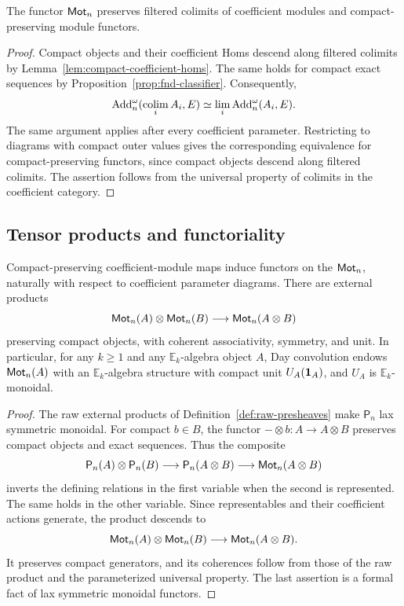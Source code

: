 \begin{lemma}\label{lem:motive-filtered-colimits}
The functor $\mathsf{Mot}_n$ preserves filtered colimits
of coefficient modules and compact-preserving
module functors.
\end{lemma}

\begin{proof}
Compact objects and their coefficient Homs
descend along filtered colimits by
Lemma~\ref{lem:compact-coefficient-homs}.
The same holds for compact exact sequences
by Proposition~\ref{prop:fnd-classifier}.
Consequently,
\[
 \operatorname{Add}_n^\omega(\operatorname*{colim}_i A_i,E)
 \simeq\lim_i\operatorname{Add}_n^\omega(A_i,E).
\]
The same argument applies after every coefficient
parameter. Restricting to diagrams with compact
outer values gives the corresponding equivalence
for compact-preserving functors, since compact
objects descend along filtered colimits.
The assertion follows from the universal property
of colimits in the coefficient category.
\end{proof}



\subsection{Tensor products and functoriality}

\begin{proposition}\label{prop:motivic-products}
Compact-preserving coefficient-module maps induce functors on the
$\mathsf{Mot}_n$, naturally with respect to coefficient parameter diagrams.
There are external products
\[
 \mathsf{Mot}_n(A)\otimes\mathsf{Mot}_n(B)\longrightarrow\mathsf{Mot}_n(A\otimes B)
\]
preserving compact objects, with coherent associativity, symmetry,
and unit. 
In particular, for any $k\geq1$ and any $\mathbb E_k$-algebra
object $A$, Day convolution
endows $\mathsf{Mot}_n(A)$ with an $\mathbb E_k$-algebra
structure with compact unit $U_A(\mathbf 1_A)$,
and $U_A$ is $\mathbb E_k$-monoidal.
\end{proposition}


\begin{proof}
The raw external products of
Definition~\ref{def:raw-presheaves}
make $\mathsf P_n$ lax symmetric monoidal.
For compact $b\in B$, the functor
$-\otimes b:A\to A\otimes B$
preserves compact objects and exact sequences.
Thus the composite
\[
 \mathsf P_n(A)\otimes\mathsf P_n(B)
 \longrightarrow\mathsf P_n(A\otimes B)
 \longrightarrow\mathsf{Mot}_n(A\otimes B)
\]
inverts the defining relations in the first
variable when the second is represented.
The same holds in the other variable.
Since representables and their coefficient actions
generate, the product descends to
\[
 \mathsf{Mot}_n(A)\otimes\mathsf{Mot}_n(B)\longrightarrow\mathsf{Mot}_n(A\otimes B).
\]
It preserves compact generators, and its
coherences follow from those of the raw product
and the parameterized universal property.
The last assertion is a formal fact of lax symmetric monoidal functors.
\end{proof}



